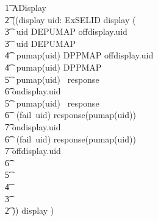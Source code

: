 \begin{circus}
        \t1 ADisplay \circdef \\
        \t2 ((\lpar \lchanset display \rchanset \rpar uid: ExSELID \circspot \lpar \emptyset \rpar display \then ( \\
        \t3 \circif\ uid \notin DEPUMAP \circthen offdisplay.uid \then \Skip\\
        \t3 \circelse\ uid \in DEPUMAP \circthen \\
            \t4 \circif\ pumap(uid) \notin DPPMAP \circthen offdisplay.uid \then \Skip\\
            \t4 \circelse\ pumap(uid) \in DPPMAP \circthen \\
                \t5 \circif\ pumap(uid) \notin \dom~response \circthen \\
                    \t6 ondisplay.uid \then \Skip\\
                \t5 \circelse\ pumap(uid) \in \dom~response \circthen \\
                    \t6 \circif\ (fail~uid) \notin response(pumap(uid)) \circthen \\
                    \t7 ondisplay.uid \then \Skip\\
                    \t6 \circelse\ (fail~uid) \in response(pumap(uid)) \circthen \\
                    \t7 offdisplay.uid \then \Skip \\
                    \t6 \circfi \\
                \t5 \circfi \\
            \t4 \circfi \\
        \t3 \circfi \\
        \t2 )) \circhide \lchanset display \rchanset )\\

\end{circus}
